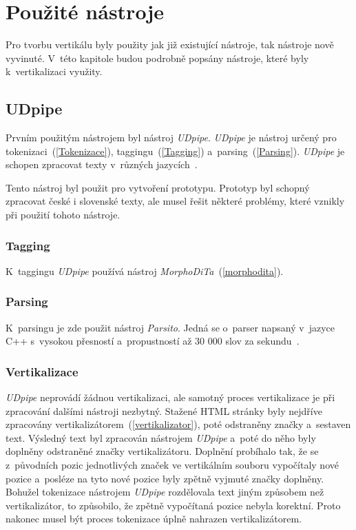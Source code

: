 \section{Použité nástroje}
Pro tvorbu vertikálu byly použity jak již existující nástroje, tak nástroje nově vyvinuté. V~této kapitole
budou podrobně popsány nástroje, které byly k~vertikalizaci využity.

\subsection{UDpipe}
Prvním použitým nástrojem byl nástroj \textit{UDpipe}. \textit{UDpipe} je nástroj určený pro tokenizaci~(\ref{Tokenizace}),
taggingu~(\ref{Tagging}) a~parsing~(\ref{Parsing}). \textit{UDpipe} je schopen zpracovat texty v~různých jazycích~\cite{UDPIPE}.

Tento nástroj byl použit pro vytvoření prototypu. Prototyp byl schopný zpracovat české i slovenské texty, ale musel
řešit některé problémy, které vznikly při použití tohoto nástroje.

\subsubsection{Tagging}
K~taggingu \textit{UDpipe} používá nástroj \textit{MorphoDiTa}~(\ref{morphodita}).

\subsubsection{Parsing}
K~parsingu je zde použit nástroj \textit{Parsito}. Jedná se o~parser napsaný v~jazyce C++ s~vysokou přesností
a~propustností až 30 000 slov za sekundu~\cite{PARSITO}.

\subsubsection{Vertikalizace}
\textit{UDpipe} neprovádí žádnou vertikalizaci, ale samotný proces vertikalizace je při zpracování dalšími nástroji
nezbytný. Stažené HTML stránky byly nejdříve zpracovány vertikalizátorem~(\ref{vertikalizator}), poté odstraněny
značky a~sestaven text. Výsledný text byl zpracován nástrojem \textit{UDpipe} a~poté do něho byly doplněny
odstraněné značky vertikalizátoru. Doplnění probíhalo tak, že se z~původních pozic jednotlivých značek ve vertikálním
souboru vypočítaly nové pozice a~posléze na tyto nové pozice byly zpětně vyjmuté značky doplněny. Bohužel tokenizace nástrojem \textit{UDpipe} rozdělovala text
jiným způsobem než vertikalizátor, to způsobilo, že zpětně vypočítaná pozice nebyla korektní. Proto nakonec musel být
proces tokenizace úplně nahrazen vertikalizátorem.

